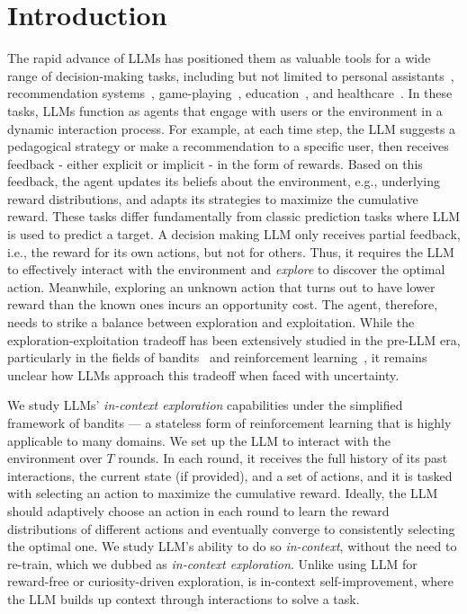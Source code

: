 \section{Introduction}
The rapid advance of LLMs has positioned them as valuable tools for a wide range of decision-making tasks, including but not limited to personal assistants~\citep{liu2024dellma}, recommendation systems~\citep{li2023large}, game-playing~\citep{wang2023voyager, wang2023describe}, education~\citep{nie2024gpt, he2024evaluating}, and healthcare~\citep{singhal2023large}. 
In these tasks, LLMs function as agents that engage with users or the environment in a dynamic interaction process. For example, at each time step, the LLM suggests a pedagogical strategy or make a recommendation to a specific user, then receives feedback - either explicit or implicit - in the form of rewards. Based on this feedback, the agent updates its beliefs about the environment, e.g., underlying reward distributions, and adapts its strategies to maximize the cumulative reward. 
These tasks differ fundamentally from classic prediction tasks where LLM is used to predict a target. A decision making LLM only receives partial feedback, i.e., the reward for its own actions, but not for others. Thus, it requires the LLM to effectively interact with the environment and \emph{explore} to discover the optimal action. Meanwhile, exploring an unknown action that turns out to have lower reward than the known ones incurs an opportunity cost. The agent, therefore, needs to strike a balance between exploration and exploitation.
While the exploration-exploitation tradeoff has been extensively studied in the pre-LLM era, particularly in the fields of bandits~\citep{li2010contextual, slivkins2019introduction} and reinforcement learning~\citep{mnih2013playing,osband2013more,sutton2018reinforcement}, it remains unclear how LLMs approach this tradeoff when faced with uncertainty. 

We study LLMs' \emph{in-context exploration} capabilities under the simplified framework of bandits — a stateless form of reinforcement learning that is highly applicable to many domains. 
We set up the LLM to interact with the environment over $T$ rounds. In each round, it receives the full history of its past interactions, the current state (if provided), and a set of actions, and it is tasked with selecting an action to maximize the cumulative reward. 
Ideally, the LLM should adaptively choose an action in each round to learn the reward distributions of different actions and eventually converge to consistently selecting the optimal one. 
We study LLM's ability to do so \emph{in-context}, without the need to re-train, which we dubbed as  \emph{in-context exploration}. Unlike using LLM for reward-free or curiosity-driven exploration, \ice is in-context self-improvement, where the LLM builds up context through interactions to solve a task.

